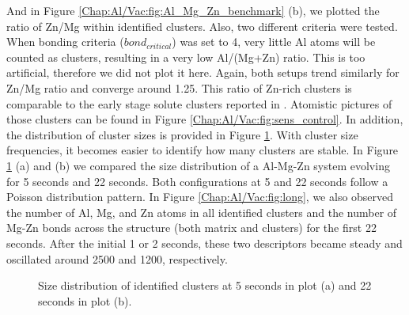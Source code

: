 And in Figure \ref{Chap:Al/Vac:fig:Al_Mg_Zn_benchmark} (b), we plotted the ratio of Zn/Mg within identified clusters. Also, two different criteria were tested. When bonding criteria ($bond_{critical}$) was set to 4, very little Al atoms will be counted as clusters, resulting in a very low Al/(Mg+Zn) ratio. This is too artificial, therefore we did not plot it here. Again, both setups trend similarly for Zn/Mg ratio and converge around 1.25. This ratio of Zn-rich clusters is comparable to the early stage solute clusters reported in \cite{liu2020formation}. Atomistic pictures of those clusters can be found in Figure \ref{Chap:Al/Vac:fig:sens_control}. In addition, the distribution of cluster sizes is provided in Figure \ref{Chap:Al/Vac:fig:size_distr}. With cluster size frequencies, it becomes easier to identify how many clusters are stable. In Figure \ref{Chap:Al/Vac:fig:size_distr} (a) and (b) we compared the size distribution of a Al-Mg-Zn system evolving for 5 seconds and 22 seconds. Both configurations at 5 and 22 seconds follow a Poisson distribution pattern. In Figure \ref{Chap:Al/Vac:fig:long}, we also observed the number of Al, Mg, and Zn atoms in all identified clusters and the number of Mg-Zn bonds across the structure (both matrix and clusters) for the first 22 seconds. After the initial 1 or 2 seconds, these two descriptors became steady and oscillated around 2500 and 1200, respectively.


\begingroup
\begin{figure}[!ht]
  \centering
\caption[Size distribution of identified clusters at 5 seconds and 22 seconds.]{Size distribution of identified clusters at 5 seconds in plot (a) and 22 seconds in plot (b).}
\label{Chap:Al/Vac:fig:size_distr}
\end{figure}
\endgroup


